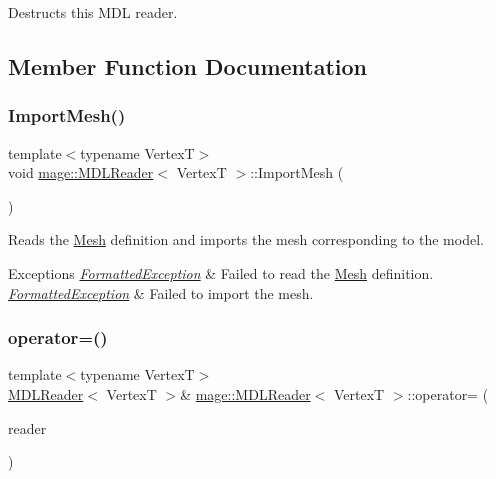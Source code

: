 Destructs this M\+DL reader. 

\subsection{Member Function Documentation}
\hypertarget{classmage_1_1_m_d_l_reader_ab688ce530cab867d155b696b2a1133a0}{}\label{classmage_1_1_m_d_l_reader_ab688ce530cab867d155b696b2a1133a0} 
\subsubsection{\texorpdfstring{Import\+Mesh()}{ImportMesh()}}
{\footnotesize\ttfamily template$<$typename VertexT$>$ \\
void \hyperlink{classmage_1_1_m_d_l_reader}{mage\+::\+M\+D\+L\+Reader}$<$ VertexT $>$\+::Import\+Mesh (\begin{DoxyParamCaption}{ }\end{DoxyParamCaption})\hspace{0.3cm}{\ttfamily [private]}}

Reads the \hyperlink{classmage_1_1_mesh}{Mesh} definition and imports the mesh corresponding to the model.


\begin{DoxyExceptions}{Exceptions}
{\em \hyperlink{structmage_1_1_formatted_exception}{Formatted\+Exception}} & Failed to read the \hyperlink{classmage_1_1_mesh}{Mesh} definition. \\
\hline
{\em \hyperlink{structmage_1_1_formatted_exception}{Formatted\+Exception}} & Failed to import the mesh. \\
\hline
\end{DoxyExceptions}
\hypertarget{classmage_1_1_m_d_l_reader_aa60388b9e76eb2244f356d1d5fde2cb6}{}\label{classmage_1_1_m_d_l_reader_aa60388b9e76eb2244f356d1d5fde2cb6} 
\subsubsection{\texorpdfstring{operator=()}{operator=()}\hspace{0.1cm}{\footnotesize\ttfamily [1/2]}}
{\footnotesize\ttfamily template$<$typename VertexT$>$ \\
\hyperlink{classmage_1_1_m_d_l_reader}{M\+D\+L\+Reader}$<$ VertexT $>$\& \hyperlink{classmage_1_1_m_d_l_reader}{mage\+::\+M\+D\+L\+Reader}$<$ VertexT $>$\+::operator= (\begin{DoxyParamCaption}\item[{const \hyperlink{classmage_1_1_m_d_l_reader}{M\+D\+L\+Reader}$<$ VertexT $>$ \&}]{reader }\end{DoxyParamCaption})\hspace{0.3cm}{\ttfamily [delete]}}

